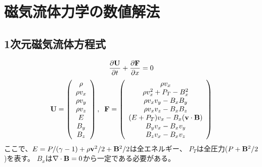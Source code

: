 \chapter{ 磁気流体力学の数値解法}


\section{1次元磁気流体方程式}

\begin{equation}
    \frac{\partial {\bf U}}{\partial t} 
    + \frac{\partial {\bf F}}{\partial x}=0
\end{equation}
\begin{equation}
    {\bf U} = \left( 
        \begin{array}{c}
            \rho \\
            \rho v_x \\
            \rho v_y \\
            \rho v_z \\
            E\\
            B_y \\
            B_z \\
    \end{array}
\right),\;\;
    {\bf F} = \left( 
        \begin{array}{c}
            \rho v_x \\
            \rho v_x^2 + P_T - B_x^2 \\
            \rho v_x v_y  - B_x B_y \\
            \rho v_x v_z  - B_x B_z \\
            (E + P_T)v_x - B_x ({\bf v}\cdot{\bf B}) \\
            B_y v_x - B_x v_y\\
            B_z v_x - B_x v_z\\
    \end{array}
\right)
\end{equation}
ここで、$E=P/(\gamma-1) + \rho {\bf v}^2/2 + {\bf B}^2/2$は全エネルギー、
$P_T$は全圧力($P+{\bf B}^2/2$)を表す。
$B_x$は$\nabla\cdot {\bf B}=0$から一定である必要がある。

\clearpage
